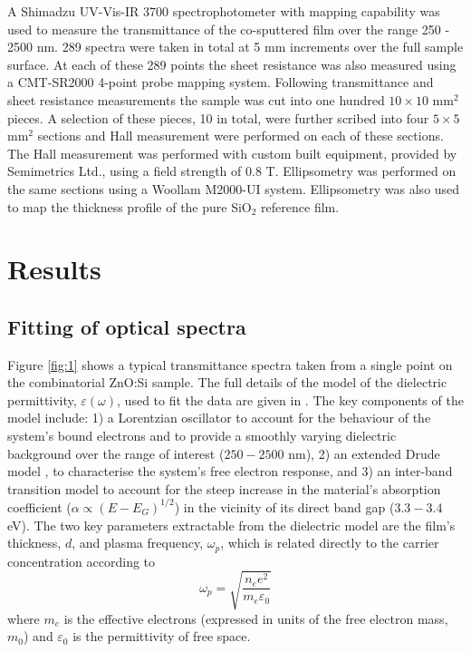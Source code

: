 \documentclass[aps,prl,preprint,showpacs,showkeys,linenumbers]{revtex4-1}
\begin{document}
A Shimadzu UV-Vis-IR 3700 spectrophotometer with mapping capability was used to measure the transmittance of the co-sputtered film over the range 250 - 2500 nm. 289 spectra were taken in total at 5 mm increments over the full sample surface. At each of these 289 points the sheet resistance was also measured using a CMT-SR2000 4-point probe mapping system. Following transmittance and sheet resistance measurements the sample was cut into one hundred $10\times10$ mm$^2$ pieces. A selection of these pieces, 10 in total, were further scribed into four $5\times5$ mm$^2$ sections and Hall measurement were performed on each of these sections. The Hall measurement was performed with custom built equipment, provided by Semimetrics Ltd., using a field strength of 0.8 T.  Ellipsometry was performed on the same sections using a Woollam M2000-UI system. Ellipsometry was also used to map the thickness profile of the pure SiO$_{2}$ reference film.

\section{Results}\label{sec:2}

\subsection{Fitting of optical spectra}\label{sec:2.1}

Figure \ref{fig:1} shows a typical transmittance spectra taken from a single point on the combinatorial ZnO:Si sample. The full details of the model of the dielectric permittivity, $\varepsilon(\omega)$, used to fit the data are given in \cite{Treharne2012}. The key components of the model include: 1) a Lorentzian oscillator to account for the behaviour of the system's bound electrons and to provide a smoothly varying dielectric background over the range of interest ($250-2500$ nm), 2) an extended Drude model \cite{Mergel2002}, to characterise the system's free electron response, and 3) an inter-band transition model to account for the steep increase in the material's absorption coefficient ($\alpha \propto (E-E_G)^{1/2}$) in the vicinity of its direct band gap ($3.3 - 3.4$ eV). The two key parameters extractable from the dielectric model are the film's thickness, $d$, and plasma frequency, $\omega_{p}$, which is related directly to the carrier concentration according to
\begin{equation}
\label{eqn:1}
\omega_p = \sqrt{\frac{n_e e^2}{m_e \varepsilon_0}}
\end{equation}
where $m_e$ is the effective electrons (expressed in units of the free electron mass, $m_0$) and $\varepsilon_0$ is the permittivity of free space.
\end{document}
